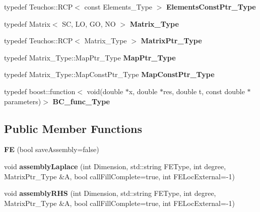 \begin{DoxyCompactItemize}
typedef Teuchos\+::\+R\+CP$<$ const Elements\+\_\+\+Type $>$ {\bfseries Elements\+Const\+Ptr\+\_\+\+Type}
\item 
\mbox{\label{classFEDD_1_1FE_af64e01f748ddafd968bfa764e1e3b79a}} 
typedef Matrix$<$ SC, LO, GO, NO $>$ {\bfseries Matrix\+\_\+\+Type}
\item 
\mbox{\label{classFEDD_1_1FE_a454153b7d0d59f4bb6cf7dfaf14fc2c4}} 
typedef Teuchos\+::\+R\+CP$<$ Matrix\+\_\+\+Type $>$ {\bfseries Matrix\+Ptr\+\_\+\+Type}
\item 
\mbox{\label{classFEDD_1_1FE_aa3d409c53c0ad3511e0784c6853e0005}} 
typedef Matrix\+\_\+\+Type\+::\+Map\+Ptr\+\_\+\+Type {\bfseries Map\+Ptr\+\_\+\+Type}
\item 
\mbox{\label{classFEDD_1_1FE_a60fd7829ed3b8c013d3a4baeceae3411}} 
typedef Matrix\+\_\+\+Type\+::\+Map\+Const\+Ptr\+\_\+\+Type {\bfseries Map\+Const\+Ptr\+\_\+\+Type}
\item 
\mbox{\label{classFEDD_1_1FE_ac4e013a4ef53f0593d3c40f71a124b7e}} 
typedef boost\+::function$<$ void(double $\ast$x, double $\ast$res, double t, const double $\ast$parameters)$>$ {\bfseries B\+C\+\_\+func\+\_\+\+Type}
\end{DoxyCompactItemize}
\subsection*{Public Member Functions}
\begin{DoxyCompactItemize}
\item 
\mbox{\label{classFEDD_1_1FE_a90d7ef30af69809d89ce6348c19b2867}} 
{\bfseries FE} (bool save\+Assembly=false)
\item 
\mbox{\label{classFEDD_1_1FE_af7f544059ddd9b728ed39f53f1d795a8}} 
void {\bfseries assembly\+Laplace} (int Dimension, std\+::string F\+E\+Type, int degree, Matrix\+Ptr\+\_\+\+Type \&A, bool call\+Fill\+Complete=true, int F\+E\+Loc\+External=-\/1)
\item 
\mbox{\label{classFEDD_1_1FE_a6dfb0bcfe14e74182b31078b48a93f54}} 
void {\bfseries assembly\+R\+HS} (int Dimension, std\+::string F\+E\+Type, int degree, Matrix\+Ptr\+\_\+\+Type \&A, bool call\+Fill\+Complete=true, int F\+E\+Loc\+External=-\/1)
\end{DoxyCompactItemize}
